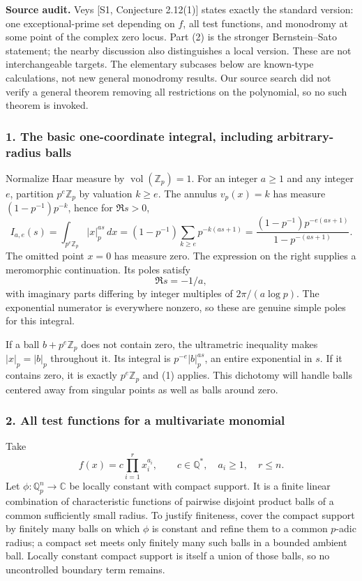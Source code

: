 \documentclass[11pt]{article}
\begin{document}
\textbf{Source audit.} Veys [S1, Conjecture 2.12(1)] states exactly the standard version: one exceptional-prime set depending on $f$, all test functions, and monodromy at some point of the complex zero locus. Part (2) is the stronger Bernstein--Sato statement; the nearby discussion also distinguishes a local version. These are not interchangeable targets. The elementary subcases below are known-type calculations, not new general monodromy results. Our source search did not verify a general theorem removing all restrictions on the polynomial, so no such theorem is invoked.

\subsubsection{1. The basic one-coordinate integral, including arbitrary-radius balls}
Normalize Haar measure by $\operatorname{vol}(\mathbb Z_p)=1$. For an integer $a\ge1$ and any integer $e$, partition $p^e\mathbb Z_p$ by valuation $k\ge e$. The annulus $v_p(x)=k$ has measure $(1-p^{-1})p^{-k}$, hence for $\Re s>0$,
\[
 I_{a,e}(s)=\int_{p^e\mathbb Z_p}|x|_p^{as}\,dx
 =(1-p^{-1})\sum_{k\ge e}p^{-k(as+1)}
 =\frac{(1-p^{-1})p^{-e(as+1)}}{1-p^{-(as+1)}}.         \tag{1}
\]
The omitted point $x=0$ has measure zero. The expression on the right supplies a meromorphic continuation. Its poles satisfy
\[
 \Re s=-1/a,
\]
with imaginary parts differing by integer multiples of $2\pi/(a\log p)$. The exponential numerator is everywhere nonzero, so these are genuine simple poles for this integral.

If a ball $b+p^e\mathbb Z_p$ does not contain zero, the ultrametric inequality makes $|x|_p=|b|_p$ throughout it. Its integral is
$p^{-e}|b|_p^{as}$, an entire exponential in $s$. If it contains zero, it is exactly $p^e\mathbb Z_p$ and (1) applies. This dichotomy will handle balls centered away from singular points as well as balls around zero.

\subsubsection{2. All test functions for a multivariate monomial}
Take
\[
 f(x)=c\prod_{i=1}^r x_i^{a_i},\qquad
 c\in\mathbb Q^*,\quad a_i\ge1,\quad r\le n.
\]
Let $\phi:\mathbb Q_p^n\to\mathbb C$ be locally constant with compact support. It is a finite linear combination of characteristic functions of pairwise disjoint product balls of a common sufficiently small radius. To justify finiteness, cover the compact support by finitely many balls on which $\phi$ is constant and refine them to a common $p$-adic radius; a compact set meets only finitely many such balls in a bounded ambient ball. Locally constant compact support is itself a union of those balls, so no uncontrolled boundary term remains.
\end{document}
